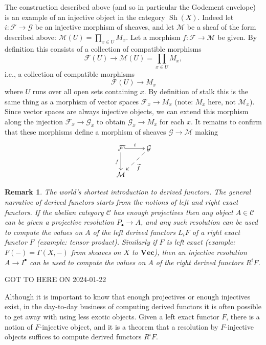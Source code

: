 \documentclass[12pt]{article}
\theoremstyle{plain}
\newtheorem{rem}[thm]{Remark}
\theoremstyle{definition}
\numberwithin{equation}{section}
\DeclareMathOperator{\sheaves}{Sh}
\newcommand{\wtil}[1]{\widetilde{#1}}
\newcommand{\CC}{\mathcal{C}}
\newcommand{\CF}{\mathcal{F}}
\newcommand{\CG}{\mathcal{G}}
\newcommand{\CM}{\mathcal{M}}
\newcommand{\Vect}{\mathbf{Vec}}
\begin{document}
The construction described above (and so in particular the Godement envelope) is an example of an injective object in the category $\sheaves(X)$. Indeed let $i : \CF \rightarrow \CG$ be an injective morphism of sheaves, and let $\CM$ be a sheaf of the form described above: $\CM(U) = \prod_{x \in U} M_x$. Let a morphism $f : \CF \rightarrow \CM$ be given. By definition this consists of a collection of compatible morphisms
\[
\CF(U) \rightarrow \CM(U) = \prod_{x \in U} M_x,
\]
i.e., a collection of compatible morphisms
\[
\CF(U) \rightarrow M_x
\]
where $U$ runs over all open sets containing $x$. By definition of stalk this is the same thing as a morphism of vector spaces $\CF_x \rightarrow M_x$ (note: $M_x$ here, not $\CM_x$). Since vector spaces are always injective objects, we can extend this morphism along the injection $\CF_x \rightarrow \CG_x$ to obtain $\CG_x \rightarrow M_x$ for each $x$. It remains to confirm that these morphisms define a morphism of sheaves $\CG \rightarrow \CM$ making
\begin{align*}
\xymatrix{
\CF \ar@{^{(}->}[r]^{i} \ar@{->}[d]_{f} & \CG \ar@{-->}[dl]^{\wtil{f}} \\
%
\CM \\
}
\end{align*}


\begin{rem}
The world's shortest introduction to derived functors. The general narrative of derived functors starts from the notions of left and right exact functors. If the abelian category $\CC$ has enough projectives then any object $A \in \CC$ can be given a projective resolution $P_\bullet \rightarrow A$, and any such resolution can be used to compute the values on $A$ of the left derived functors $L_iF$ of a right exact functor $F$ (example: tensor product). Similarly if $F$ is left exact (example: $F(-) = \Gamma(X, -)$ from sheaves on $X$ to $\Vect$), then an injective resolution $A \rightarrow I^\bullet$ can be used to compute the values on $A$ of the right derived functors $R^iF$.
\end{rem}








{\color{red}GOT TO HERE ON 2024-01-22}


Although it is important to know that enough projectives or enough injectives exist, in the day-to-day business of computing derived functors it is often possible to get away with using less exotic objects. Given a left exact functor $F$, there is a notion of $F$-injective object, and it is a theorem that a resolution by $F$-injective objects suffices to compute derived functors $R^iF$.
\end{document}
